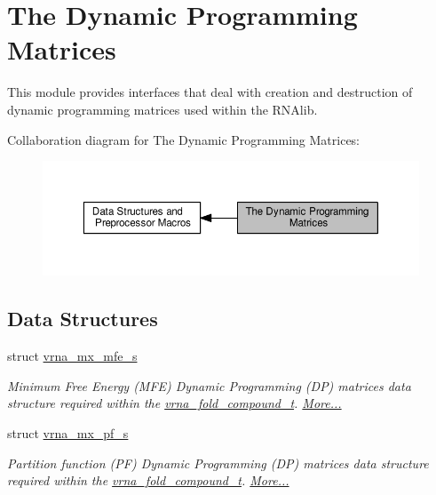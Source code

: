 \hypertarget{group__dp__matrices}{}\section{The Dynamic Programming Matrices}
\label{group__dp__matrices}


This module provides interfaces that deal with creation and destruction of dynamic programming matrices used within the R\+N\+Alib.  


Collaboration diagram for The Dynamic Programming Matrices\+:
\nopagebreak
\begin{figure}[H]
\begin{center}
\leavevmode
\includegraphics[width=350pt]{group__dp__matrices}
\end{center}
\end{figure}
\subsection*{Data Structures}
\begin{DoxyCompactItemize}
\item 
struct \hyperlink{group__dp__matrices_structvrna__mx__mfe__s}{vrna\+\_\+mx\+\_\+mfe\+\_\+s}
\begin{DoxyCompactList}\small\item\em Minimum Free Energy (M\+FE) Dynamic Programming (DP) matrices data structure required within the \hyperlink{group__fold__compound_ga1b0cef17fd40466cef5968eaeeff6166}{vrna\+\_\+fold\+\_\+compound\+\_\+t}.  \hyperlink{group__dp__matrices_structvrna__mx__mfe__s}{More...}\end{DoxyCompactList}\item 
struct \hyperlink{group__dp__matrices_structvrna__mx__pf__s}{vrna\+\_\+mx\+\_\+pf\+\_\+s}
\begin{DoxyCompactList}\small\item\em Partition function (PF) Dynamic Programming (DP) matrices data structure required within the \hyperlink{group__fold__compound_ga1b0cef17fd40466cef5968eaeeff6166}{vrna\+\_\+fold\+\_\+compound\+\_\+t}.  \hyperlink{group__dp__matrices_structvrna__mx__pf__s}{More...}\end{DoxyCompactList}\end{DoxyCompactItemize}
